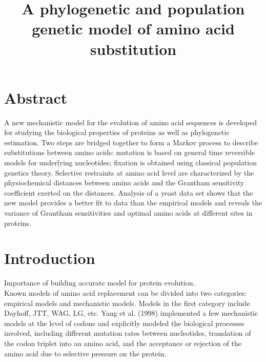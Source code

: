 \documentclass[13pt]{article}
\title{A phylogenetic and population genetic model of amino acid substitution}
\author{}
\begin{document}
\maketitle
\section{Abstract}
A new mechanistic model for the evolution of amino acid sequences is developed for studying the biological properties of proteins as well as phylogenetic estimation.  Two steps are bridged together to form a Markov process to describe substitutions between amino acids: mutation is based on general time reversible models for underlying nucleotides; fixation is obtained using classical population genetics theory. Selective restraints at amino acid level are characterized by the physiochemical distances between amino acids and the Grantham sensitivity coefficient exerted on the distances. Analysis of a yeast data set shows that the new model provides a better fit to data than the empirical models and reveals the variance of Grantham sensitivities and optimal amino acids at different sites in proteins.\\

\section{Introduction}
Importance of building accurate model for protein evolution. \\

Known models of amino acid replacement can be divided into two categories: empirical models and mechanistic models. Models in the first category include Dayhoff, JTT, WAG, LG, etc. Yang et al. (1998) implemented a few mechanistic models at the level of codons and explicitly modeled the biological processes involved, including different mutation rates between nucleotides, translation of the codon triplet into an amino acid, and the acceptance or rejection of the amino acid due to selective pressure on the protein. \\
\end{document}
